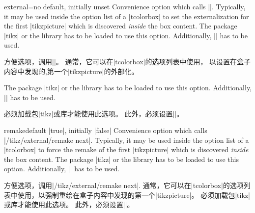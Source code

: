 \begin{docTcbKey}{external}{=}{no default, initially unset}
Convenience option which calls ||. Typically,
it may be used inside the option list of a |tcolorbox| to set the
externalization  for the first |tikzpicture| which is discovered
\emph{inside} the box content.
The package |tikz| \cite{tantau:tikz_and_pgf} or the library  has to be loaded to use this option.
Additionally, |\usetikzlibrary{external}| has to be used.

方便选项，调用||。%
通常，它可以在|tcolorbox|的选项列表中使用，%
以设置在盒子内容中发现的,第一个|tikzpicture|的外部化。%

The package |tikz| \cite{tantau:tikz_and_pgf} or the library  has to be loaded to use this option.
Additionally, |\usetikzlibrary{external}| has to be used.

必须加载包|tikz|或库才能使用此选项。%
此外，必须设置|\usetikzlibrary{external}|。
\end{docTcbKey}



\begin{docTcbKey}{remake}{}{default |true|, initially |false|}
Convenience option which calls |/tikz/external/remake next|. Typically,
it may be used inside the option list of a |tcolorbox| to force the remake
of the first |tikzpicture| which is discovered \emph{inside} the box content.
The package |tikz| \cite{tantau:tikz_and_pgf} or the library  has to be loaded to use this option.
Additionally, |\usetikzlibrary{external}| has to be used.

方便选项，调用|/tikz/external/remake next|. %
通常，它可以在|tcolorbox|的选项列表中使用，以强制重绘在盒子内容中发现的第一个|tikzpicture|。%
必须加载包|tikz|或库才能使用此选项。%
此外，必须设置|\usetikzlibrary{external}|。
\end{docTcbKey}
